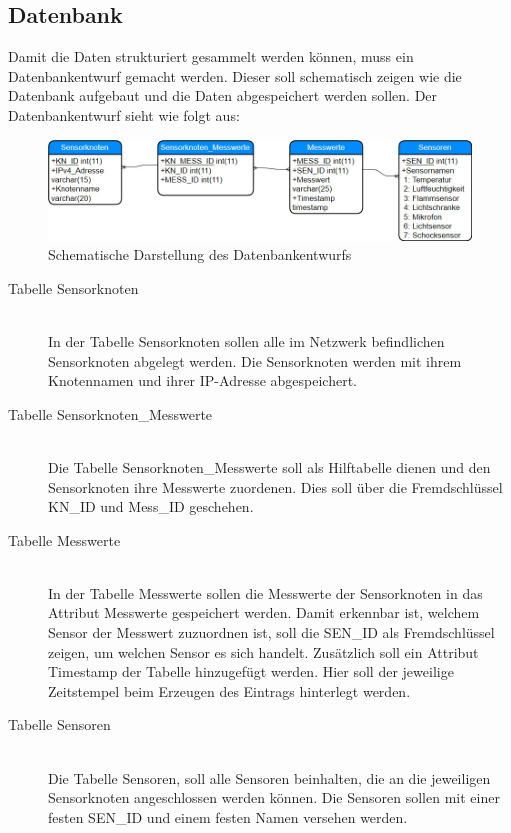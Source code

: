 \subsection{Datenbank}\label{sub:Datenbank}
Damit die Daten strukturiert gesammelt werden können, muss ein Datenbankentwurf gemacht werden. Dieser soll schematisch zeigen wie die Datenbank aufgebaut und die Daten abgespeichert werden sollen. Der Datenbankentwurf sieht wie folgt aus:
\begin{landscape}
	\begin{figure}[ht]
		\begin{center}
			\includegraphics[width=\paperwidth]{Bilder/Kapitel3/Datenbankentwurf1.jpg}
			\caption[Schematische Darstellung des Datenbankentwurfs]{Schematische Darstellung des Datenbankentwurfs}
			\label{fig:Datenbankentwurf}
		\end{center}
	\end{figure}
\end{landscape}
\begin{description}
	\item[Tabelle Sensorknoten] \hfill \\
		In der Tabelle Sensorknoten sollen alle im Netzwerk befindlichen Sensorknoten abgelegt werden. Die Sensorknoten werden mit ihrem Knotennamen und ihrer IP-Adresse abgespeichert.
	\item[Tabelle Sensorknoten\_Messwerte] \hfill \\
		Die Tabelle Sensorknoten\_Messwerte soll als Hilftabelle dienen und den Sensorknoten ihre Messwerte zuordenen. Dies soll über die Fremdschlüssel KN\_ID und Mess\_ID geschehen.
	\item[Tabelle Messwerte] \hfill \\
		In der Tabelle Messwerte sollen die Messwerte der Sensorknoten in das Attribut Messwerte gespeichert werden. Damit erkennbar ist, welchem Sensor der Messwert zuzuordnen ist, soll die SEN\_ID als Fremdschlüssel zeigen, um welchen Sensor es sich handelt. Zusätzlich soll ein Attribut Timestamp der Tabelle hinzugefügt werden. Hier soll der jeweilige Zeitstempel beim Erzeugen des Eintrags hinterlegt werden.
	\item[Tabelle Sensoren] \hfill \\	
		Die Tabelle Sensoren, soll alle Sensoren beinhalten, die an die jeweiligen Sensorknoten angeschlossen werden können. Die Sensoren sollen mit einer festen SEN\_ID und einem festen Namen versehen werden.
\end{description}

